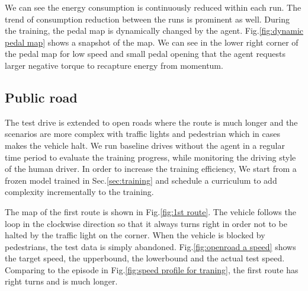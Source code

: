 \documentclass{article}
\begin{document}
We can see the energy consumption is continuously reduced within each run. The trend of consumption reduction between the runs is prominent as well. During the training, the pedal map is dynamically changed by the agent. Fig.\@\ref{fig:dynamic pedal map} shows a snapshot of the map. We can see in the lower right corner of the pedal map for low speed and small pedal opening that the agent requests larger negative torque to recapture energy from momentum.

\subsection{Public road}\label{sec:public road}

The test drive is extended to open roads where the route is much longer and the scenarios are more complex with traffic lights and pedestrian which in cases makes the vehicle halt. We run baseline drives without the agent in a regular time period to evaluate the training progress, while monitoring the driving style of the human driver. In order to increase the training efficiency, We start from a frozen model trained in Sec.\@\ref{sec:training} and schedule a curriculum to add complexity incrementally to the training.

The map of the first route is shown in Fig.\@\ref{fig:1st route}. The vehicle follows the loop in the clockwise direction so that it always turns right in order not to be halted by the traffic light on the corner. When the vehicle is blocked by pedestrians, the test data is simply abandoned. Fig.\@\ref{fig:openroad a speed} shows the target speed, the upperbound, the lowerbound and the actual test speed. Comparing to the episode in Fig.\@\ref{fig:speed profile for traning}, the first route has right turns and is much longer.
\end{document}
